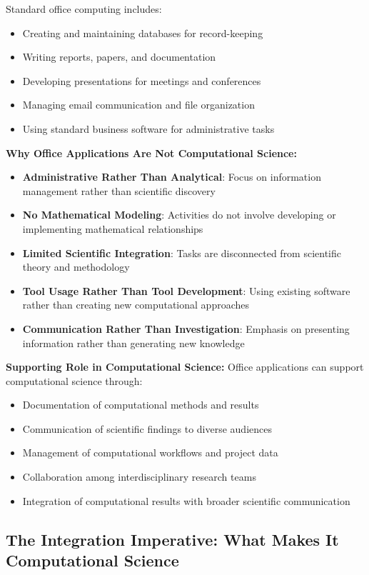 Standard office computing includes:
\begin{itemize}
    \item Creating and maintaining databases for record-keeping
    \item Writing reports, papers, and documentation
    \item Developing presentations for meetings and conferences
    \item Managing email communication and file organization
    \item Using standard business software for administrative tasks
\end{itemize}

\textbf{Why Office Applications Are Not Computational Science:}
\begin{itemize}
    \item \textbf{Administrative Rather Than Analytical}: Focus on information management rather than scientific discovery
    \item \textbf{No Mathematical Modeling}: Activities do not involve developing or implementing mathematical relationships
    \item \textbf{Limited Scientific Integration}: Tasks are disconnected from scientific theory and methodology
    \item \textbf{Tool Usage Rather Than Tool Development}: Using existing software rather than creating new computational approaches
    \item \textbf{Communication Rather Than Investigation}: Emphasis on presenting information rather than generating new knowledge
\end{itemize}

\textbf{Supporting Role in Computational Science:}
Office applications can support computational science through:
\begin{itemize}
    \item Documentation of computational methods and results
    \item Communication of scientific findings to diverse audiences
    \item Management of computational workflows and project data
    \item Collaboration among interdisciplinary research teams
    \item Integration of computational results with broader scientific communication
\end{itemize}

\subsection{The Integration Imperative: What Makes It Computational Science}

